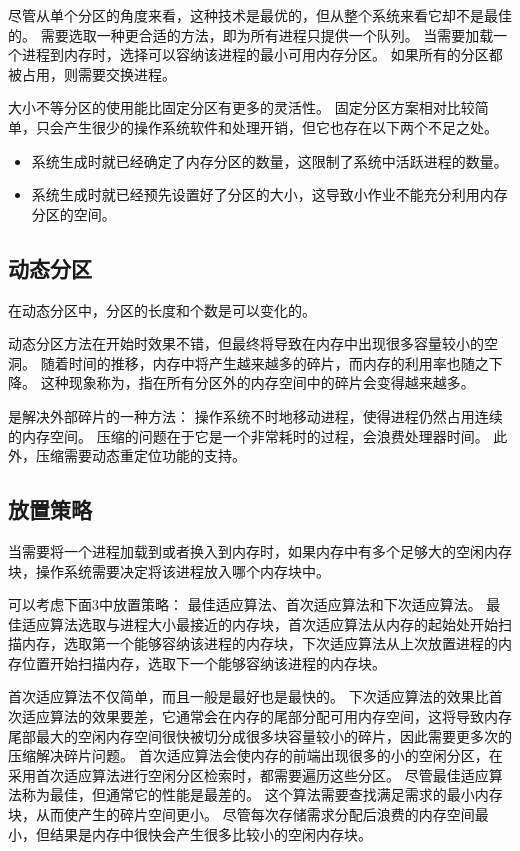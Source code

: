{{        尽管从单个分区的角度来看，这种技术是最优的，但从整个系统来看它却不是最佳的。
        需要选取一种更合适的方法，即为所有进程只提供一个队列。
        当需要加载一个进程到内存时，选择可以容纳该进程的最小可用内存分区。
        如果所有的分区都被占用，则需要交换进程。

        大小不等分区的使用能比固定分区有更多的灵活性。
        固定分区方案相对比较简单，只会产生很少的操作系统软件和处理开销，但它也存在以下两个不足之处。

        \begin{itemize}
            \item 系统生成时就已经确定了内存分区的数量，这限制了系统中活跃进程的数量。
            \item 系统生成时就已经预先设置好了分区的大小，这导致小作业不能充分利用内存分区的空间。
        \end{itemize}
    }

    \subsection{动态分区}
    {
        在动态分区中，分区的长度和个数是可以变化的。

        动态分区方法在开始时效果不错，但最终将导致在内存中出现很多容量较小的空洞。
        随着时间的推移，内存中将产生越来越多的碎片，而内存的利用率也随之下降。
        这种现象称为，指在所有分区外的内存空间中的碎片会变得越来越多。

        是解决外部碎片的一种方法：
        操作系统不时地移动进程，使得进程仍然占用连续的内存空间。
        压缩的问题在于它是一个非常耗时的过程，会浪费处理器时间。
        此外，压缩需要动态重定位功能的支持。
    }

    \subsection{放置策略}
    {
        当需要将一个进程加载到或者换入到内存时，如果内存中有多个足够大的空闲内存块，操作系统需要决定将该进程放入哪个内存块中。

        可以考虑下面3中放置策略：
        最佳适应算法、首次适应算法和下次适应算法。
        最佳适应算法选取与进程大小最接近的内存块，首次适应算法从内存的起始处开始扫描内存，选取第一个能够容纳该进程的内存块，下次适应算法从上次放置进程的内存位置开始扫描内存，选取下一个能够容纳该进程的内存块。

        首次适应算法不仅简单，而且一般是最好也是最快的。
        下次适应算法的效果比首次适应算法的效果要差，它通常会在内存的尾部分配可用内存空间，这将导致内存尾部最大的空闲内存空间很快被切分成很多块容量较小的碎片，因此需要更多次的压缩解决碎片问题。
        首次适应算法会使内存的前端出现很多的小的空闲分区，在采用首次适应算法进行空闲分区检索时，都需要遍历这些分区。
        尽管最佳适应算法称为最佳，但通常它的性能是最差的。
        这个算法需要查找满足需求的最小内存块，从而使产生的碎片空间更小。
        尽管每次存储需求分配后浪费的内存空间最小，但结果是内存中很快会产生很多比较小的空闲内存块。
    }

}
